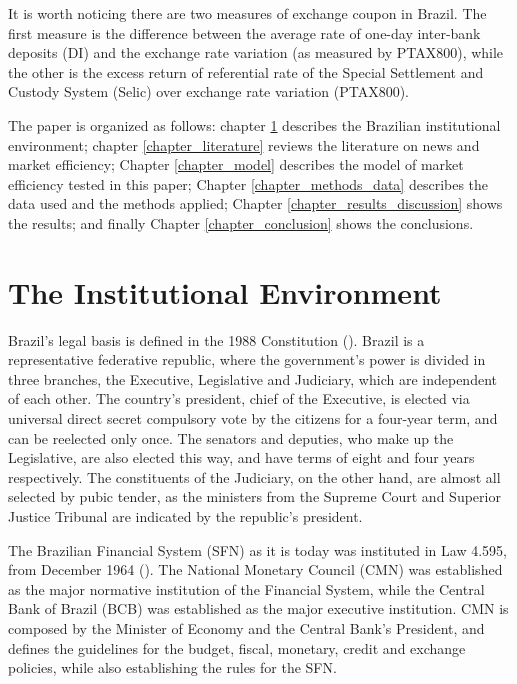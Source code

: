 \documentclass[cic,tc, english]{iiufrgs}
\begin{document}
    It is worth noticing there are two measures of exchange coupon in Brazil. The first measure is the difference between the average rate of one-day inter-bank deposits (DI) and the exchange rate variation (as measured by PTAX800), while the other is the excess return of referential rate of the Special Settlement and Custody System (Selic) over exchange rate variation (PTAX800). 
  
    The paper is organized as follows: chapter \ref{chapter_institutional} describes the Brazilian institutional environment; chapter \ref{chapter_literature} reviews the literature on news and market efficiency; Chapter \ref{chapter_model} describes the model of market efficiency tested in this paper; Chapter \ref{chapter_methods_data} describes the data used and the methods applied; Chapter \ref{chapter_results_discussion} shows the results; and finally Chapter \ref{chapter_conclusion} shows the conclusions.

\chapter{The Institutional Environment} \label{chapter_institutional}

    Brazil's legal basis is defined in the 1988 Constitution (\citet{constituicao}). Brazil is a representative federative republic, where the government's power is divided in three branches, the Executive, Legislative and Judiciary, which are independent of each other. The country's president, chief of the Executive, is elected via universal direct secret compulsory vote by the citizens for a four-year term, and can be reelected only once. The senators and deputies, who make up the Legislative, are also elected this way, and have terms of eight and four years respectively. The constituents of the Judiciary, on the other hand, are almost all selected by pubic tender, as the ministers from the Supreme Court and Superior Justice Tribunal are indicated by the republic's president.

    The Brazilian Financial System (SFN) as it is today was instituted in Law 4.595, from December 1964 (\citet{lei4595}). The National Monetary Council (CMN) was established as the major normative institution of the Financial System, while the Central Bank of Brazil (BCB) was established as the major executive institution. CMN is composed by the Minister of Economy and the Central Bank's President, and defines the guidelines for the budget, fiscal, monetary, credit and exchange policies, while also establishing the rules for the SFN.
\end{document}
